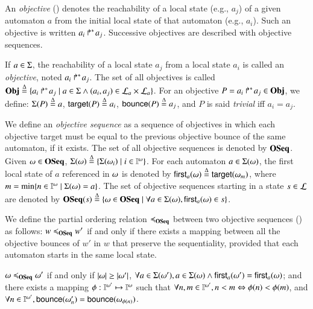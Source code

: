 An \emph{objective} () denotes the reachability of a local state (e.g., $a_j$) of a given automaton $a$
from the initial local state of that automaton (e.g., $a_i$).
Such an objective is written $\mbox{${a}_{i}\Rsh^*\!{a}_{j}$}$.
Successive objectives are described with objective sequences.

\begin{definition}
\label{def:obj}
  If $a \in \Sigma$, the reachability of a local state $a_j$ from a local state $a_i$ is called an \emph{objective}, noted $\mbox{$a_i\Rsh^*\!a_j$}$.
  The set of all objectives is called $\mathbf{Obj} \stackrel{\Delta}= \{ \mbox{$a_i\Rsh^*\!a_j$} \mid a \in \Sigma \wedge (a_i, a_j) \in \mathcal{L}_a \times \mathcal{L}_a \}$.
  For an objective $P = \mbox{$a_i\Rsh^*\!a_j$} \in \mathbf{Obj}$, we define: $\Sigma(P) \stackrel{\Delta}=
  a$, $\mathsf{target}(P)\stackrel{\Delta}= a_i$, $\mathsf{bounce}(P)\stackrel{\Delta}= a_j$,
  and $P$ is said \emph{trivial} iff $a_i = a_j$.

  We define an \emph{objective sequence} as a sequence of objectives in which each objective target must be equal to the previous objective bounce of the same automaton, if it exists.
  The set of all objective sequences is denoted by $\mathbf{OSeq}$.
  Given $\omega\in\mathbf{OSeq}$, $\Sigma(\omega) \stackrel{\Delta}= \{\Sigma(\omega_i)\mid i\in\mathbb{I}^{\omega}\}$.
For each automaton $a\in\Sigma(\omega)$,  the first local state of $a$ referenced in
$\omega$ is denoted by $\mathsf{first}_a(\omega) \stackrel{\Delta}= \mathsf{target}(\omega_m)$, where $m=\min\{n\in\mathbb{I}^{\omega}\mid \Sigma(\omega)=a\}$.
  The set of objective sequences starting in a state $s\in\mathcal{L}$ are denoted by
  $\mathbf{OSeq}(s)\stackrel{\Delta}= \{\omega\in\mathbf{OSeq}\mid\forall a\in\Sigma(\omega), \mathsf{first}_a(\omega)\in s\}$.
\end{definition}


We define the partial ordering relation $\preccurlyeq_{\mathbf{OSeq}}$ between two objective sequences () as
follows:
$w\preccurlyeq_{\mathbf{OSeq}} w'$ if and only if there exists a mapping between all the objective bounces of $w'$ in $w$
that preserve the sequentiality, provided that each automaton starts in the same
local state.

\begin{definition}[$\ltw \subset \OS\times\OS$]\label{def:ltw}
$\omega\preccurlyeq_{\mathbf{OSeq}}\omega'$ if and only if
$|\omega|\geq|\omega'|$,
$\forall a\in\Sigma(\omega'), a\in\Sigma(\omega) \wedge \mathsf{first}_a(\omega')=\mathsf{first}_a(\omega)$;
and there exists a mapping $\phi: \mathbb{I}^{\omega'}\mapsto \mathbb{I}^{\omega}$ such that
$\forall n,m \in\mathbb{I}^{\omega'}, n<m \Leftrightarrow \phi(n)<\phi(m)$,
and
$\forall n\in\mathbb{I}^{\omega'}, \mathsf{bounce}(\omega'_n)=\mathsf{bounce}(\omega_{\phi(n)})$.
\end{definition}

